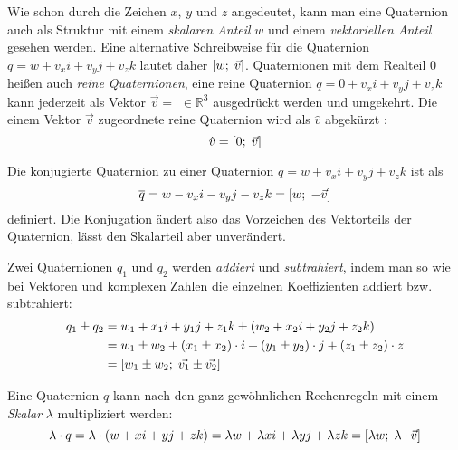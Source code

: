 Wie schon durch die Zeichen $x$, $y$ und $z$ angedeutet, kann man eine Quaternion auch als Struktur mit einem \emph{skalaren Anteil} $w$ und einem \emph{vektoriellen Anteil}  gesehen werden. Eine alternative Schreibweise für die Quaternion $q = w + v_{x}i + v_{y}j + v_{z}k$ lautet daher $\left[w ;\; \vec v \right]$. Quaternionen mit dem Realteil $0$ heißen auch \emph{reine Quaternionen}, eine reine Quaternion $q = 0 + v_{x}i + v_{y}j + v_{z}k$ kann jederzeit als Vektor $ \vec v =$  $\in \mathbb R^3$ ausgedrückt werden und umgekehrt. Die einem Vektor $\vec v$ zugeordnete reine Quaternion wird als $\hat{v}$ abgekürzt :
\begin{equation}
 \hat{v} = \left[ 0 ;\; \vec v \right]
\end{equation} 

Die konjugierte Quaternion zu einer Quaternion $q = w + v_{x}i + v_{y}j + v_{z}k$ ist als
\begin{equation}
 \overline{q} = w - v_{x}i - v_{y}j - v_{z}k = \left[ w ;\; -\vec v \right]
\end{equation}
definiert. Die Konjugation ändert also das Vorzeichen des Vektorteils der Quaternion, lässt den Skalarteil aber unverändert.

Zwei Quaternionen $q_1$ und $q_2$ werden \emph{addiert} und \emph{subtrahiert}, indem man so wie bei Vektoren und komplexen Zahlen die einzelnen Koeffizienten addiert bzw. subtrahiert:
\begin{equation}
\begin{split}
 q_1 \pm q_2 &= w_1 + x_{1}i + y_{1}j + z_{1}k \pm \left( w_2 + x_{2}i + y_{2}j + z_{2}k \right) \\
 &= w_1 \pm w_2 + \left( x_1 \pm x_2 \right) \cdot i + \left( y_1 \pm y_2 \right) \cdot j + \left( z_1 \pm z_2 \right) \cdot z \\
 &= \left[ w_1 \pm w_2 ;\; \vec{v_1} \pm \vec{v_2} \right]
\end{split}
\end{equation}

Eine Quaternion $q$ kann nach den ganz gewöhnlichen Rechenregeln mit einem \emph{Skalar} $\lambda$ multipliziert werden:
\begin{equation}
 \lambda \cdot q = \lambda \cdot (w + xi + yj + zk) = \lambda w + \lambda xi + \lambda yj + \lambda zk = \left[ \lambda w ;\; \lambda \cdot \vec v \right]
\end{equation}

